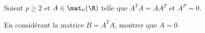 \begin{enonce}
\begin{exercise}[ID={RMS132 E1151},subtitle={CCINP PSI 2021},tags={}]
  Soient $p\geq 2$ et $A\in\mat_n(\R)$ telle que $A^T A = AA^T$ et $A^P=0$.

  En considérant la matrice $B = A^TA$, montrer que $A=0$.
\end{exercise}
\begin{solution}
\end{solution}
\end{enonce}
